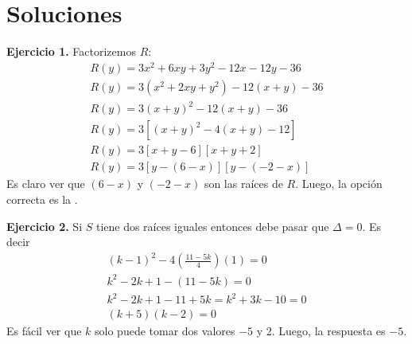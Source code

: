 \section*{\large Soluciones}
{
    \textbf{Ejercicio 1.}
        Factorizemos $R$:
        \begin{gather*}
            R(y) = 3x^2 + 6xy + 3y^2 - 12x - 12y - 36 \\
            R(y) = 3(x^2 + 2xy + y^2) - 12(x + y) - 36 \\
            R(y) = 3(x + y)^2 - 12(x + y) - 36 \\
            R(y) = 3\left[ (x + y)^2 - 4(x + y) - 12 \right] \\
            R(y) = 3\left[ x + y - 6 \right]\left[ x + y + 2 \right] \\
            R(y) = 3\left[ y - (6 - x) \right]\left[ y - (- 2 - x) \right]
        \end{gather*}
        Es claro ver que $(6 - x)$ y $(-2 - x)$ son las raíces de $R$. Luego, la opción correcta es la .

    \textbf{Ejercicio 2.}
        Si $S$ tiene dos raíces iguales entonces debe pasar que $\Delta = 0$. Es decir
        \begin{gather*}
            (k - 1)^2 - 4\left( \frac{11 - 5k}{4} \right)(1) = 0\\
            k^2 - 2k + 1 - (11 - 5k) = 0\\
            k^2 - 2k + 1 - 11 + 5k = k^2 + 3k - 10 = 0\\
            (k + 5)(k - 2) = 0
        \end{gather*}
        Es fácil ver que $k$ solo puede tomar dos valores $-5$ y 2. Luego, la respuesta es $\boxed{-5}$.

}\label{sec:large-soluciones}\label{sec:soluciones}
